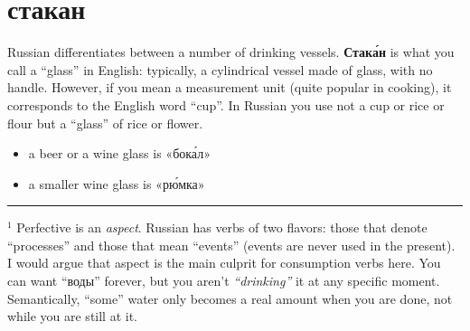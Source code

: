 \section{стакан}\label{ux441ux442ux430ux43aux430ux43d}

Russian differentiates between a number of drinking vessels.
\textbf{Стак\'{а}н} is what you call a ``glass'' in English: typically, a
cylindrical vessel made of glass, with no handle. However, if you mean a
measurement unit (quite popular in cooking), it corresponds to the
English word ``cup''. In Russian you use not a cup or rice or flour but
a ``glass'' of rice or flower.

\begin{itemize}
\tightlist
\item
  a beer or a wine glass is «бок\'{а}л»
\item
  a smaller wine glass is «р\'{ю}мка»
\end{itemize}

\begin{center}\rule{0.5\linewidth}{\linethickness}\end{center}

$^1$ Perfective is an \emph{aspect}. Russian has verbs of two flavors:
those that denote ``processes'' and those that mean ``events'' (events
are never used in the present). I would argue that aspect is the main
culprit for consumption verbs here. You can want ``воды'' forever, but
you aren't \emph{``drinking''} it at any specific moment. Semantically,
``some'' water only becomes a real amount when you are done, not while
you are still at it.
